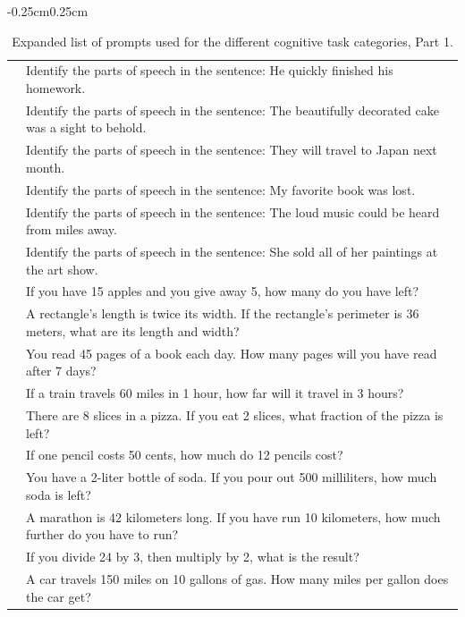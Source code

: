 \documentclass[11pt,a4paper]{ouparticle}
\begin{document}
\begin{table}[!ht]
\begin{adjustwidth}{-0.25cm}{0.25cm}
\begin{tabular}{>{\centering\arraybackslash}p{2.5cm} >{\centering\arraybackslash}p{13.5cm}}
                               & Identify the parts of speech in the sentence: He quickly finished his homework. \\
                               & Identify the parts of speech in the sentence: The beautifully decorated cake was a sight to behold. \\
                               & Identify the parts of speech in the sentence: They will travel to Japan next month. \\
                               & Identify the parts of speech in the sentence: My favorite book was lost. \\
                               & Identify the parts of speech in the sentence: The loud music could be heard from miles away. \\
                               & Identify the parts of speech in the sentence: She sold all of her paintings at the art show. \\
        \midrule
        \multirow{10}{=}{\textbf{Basic Numerical Reasoning}} & If you have 15 apples and you give away 5, how many do you have left? \\
                                  & A rectangle's length is twice its width. If the rectangle's perimeter is 36 meters, what are its length and width? \\
                                  & You read 45 pages of a book each day. How many pages will you have read after 7 days? \\
                                  & If a train travels 60 miles in 1 hour, how far will it travel in 3 hours? \\
                                  & There are 8 slices in a pizza. If you eat 2 slices, what fraction of the pizza is left? \\
                                  & If one pencil costs 50 cents, how much do 12 pencils cost? \\
                                  & You have a 2-liter bottle of soda. If you pour out 500 milliliters, how much soda is left? \\
                                  & A marathon is 42 kilometers long. If you have run 10 kilometers, how much further do you have to run? \\
                                  & If you divide 24 by 3, then multiply by 2, what is the result? \\
                                  & A car travels 150 miles on 10 gallons of gas. How many miles per gallon does the car get? \\
        \bottomrule
        \bottomrule
    \end{tabular}
    \caption{Expanded list of prompts used for the different cognitive task categories, Part 1.}
    \label{tab:full_cognitive_task_examples_part1}
\end{adjustwidth}
\end{table}
\end{document}
